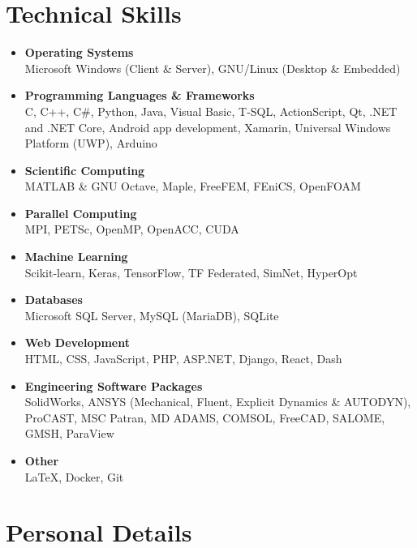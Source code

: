\documentclass{cv}
\begin{document}
\section{Technical Skills}

\begin{itemize}

\item
 \textbf{Operating Systems} \\ Microsoft Windows (Client \& Server), GNU/Linux (Desktop \& Embedded)
 \item
\textbf{Programming Languages \& Frameworks}\\  C, C++, C\#, Python, Java, Visual Basic, T-SQL, ActionScript, Qt, .NET and .NET Core, Android app development, Xamarin, Universal Windows Platform (UWP), Arduino
\item
\textbf{Scientific Computing}\\  MATLAB \& GNU Octave, Maple, FreeFEM, FEniCS, OpenFOAM
\item 
\textbf{Parallel Computing}\\ MPI, PETSc, OpenMP, OpenACC, CUDA
\item
\textbf{Machine Learning}\\ Scikit-learn, Keras, TensorFlow, TF Federated, SimNet, HyperOpt
\item
\textbf{Databases}\\ Microsoft SQL Server, MySQL (MariaDB), SQLite
\item
\textbf{Web Development} \\
HTML, CSS, JavaScript, PHP, ASP.NET, Django, React, Dash
\item
\textbf{Engineering Software Packages}\\ SolidWorks, ANSYS (Mechanical, Fluent, Explicit Dynamics \& AUTODYN), ProCAST, MSC Patran, MD ADAMS, COMSOL, FreeCAD, SALOME, GMSH, ParaView
\item
\textbf{Other}\\  \LaTeX{}, Docker, Git

\end{itemize}


\section{Personal Details}
\end{document}
